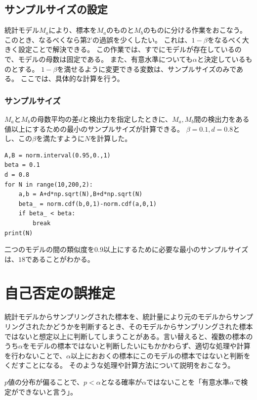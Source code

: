 \subsection{サンプルサイズの設定}
統計モデル$M_a$により、標本を$M_a$のものと$M_b$のものに分ける作業をおこなう。
このとき、なるべくなら第2'の過誤を少くしたい。
これは、$1-\beta$をなるべく大きく設定ことで解決できる。
この作業では、すでにモデルが存在しているので、モデルの母数は固定である。
また、有意水準についても$\alpha$と決定しているものとする。
$1-\beta$を満せるように変更できる変数は、サンプルサイズのみである。
ここでは、具体的な計算を行う。

\subsubsection{サンプルサイズ}
$M_a$と$M_b$の母数平均の差$d$と検出力を指定したときに、$M_a,M_b$間の検出力をある値以上にするための最小のサンプルサイズが計算できる。
$\beta=0.1,d=0.8$とし、この$\beta$を満たすように$N$を計算した。

\begin{lstlisting}
A,B = norm.interval(0.95,0.,1)
beta = 0.1
d = 0.8
for N in range(10,200,2):
    a,b = A+d*np.sqrt(N),B+d*np.sqrt(N)
    beta_ = norm.cdf(b,0,1)-norm.cdf(a,0,1)
    if beta_ < beta:
        break
print(N)
\end{lstlisting}
二つのモデルの間の類似度を$0.9$以上にするために必要な最小のサンプルサイズは、$18$であることがわかる。

\section{自己否定の誤推定}
統計モデルからサンプリングされた標本を、統計量により元のモデルからサンプリングされたかどうかを判断するとき、そのモデルからサンプリングされた標本ではないと想定以上に判断してしまうことがある。言い替えると、複数の標本のうち$\alpha$をモデルの標本ではないと判断したいにもかかわらず、適切な処理や計算を行わないことで、$\alpha$以上におおくの標本にこのモデルの標本ではないと判断をくだすことになる。
そのような処理や計算方法について説明をおこなう。
\begin{defi}
  $p$値の分布が偏ることで、$p<\alpha$となる確率が$\alpha$ではないことを「有意水準$\alpha$で検定ができないと言う」。
\end{defi}


